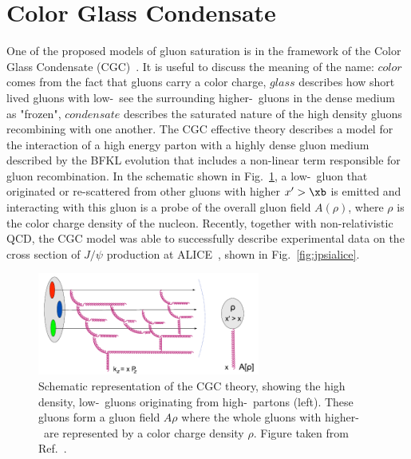 \FloatBarrier
\section{Color Glass Condensate}

One of the proposed models of gluon saturation is in the framework of the Color Glass Condensate (CGC)~\cite{Iancu:2002xk, Kharzeev:2004bw, Gelis:2012ri}. It is useful to discuss the meaning of the name: $color$ comes from the fact that gluons carry a color charge, $glass$ describes how short lived gluons with low-\xb\ see the surrounding higher-\xb\ gluons in the dense medium as "frozen", $condensate$ describes the saturated nature of the high density gluons recombining with one another. The CGC effective theory describes a model for the interaction of a high energy parton with a highly dense gluon medium described by the BFKL evolution that includes a non-linear term responsible for gluon recombination. In the schematic shown in Fig.~\ref{fig:cgcfield}, a low-\xb\ gluon that originated or re-scattered from other gluons with higher $x' > \xb$ is emitted and interacting with this gluon is a probe of the overall gluon field $A(\rho)$, where $\rho$ is the color charge density of the nucleon. Recently, together with non-relativistic QCD, the CGC model was able to successfully describe experimental data on the cross section of $J/\psi$ production at ALICE~\cite{Weber:2017kjj}, shown in Fig.~\ref{fig:jpsialice}.


\begin{figure}
	\centering
	\includegraphics[width=0.65\textwidth]{figures/cgc_field_2.pdf} 
	\caption{ Schematic representation of the CGC theory, showing the high density, low-\xb\ gluons originating from high-\xb\ partons (left). These gluons form a gluon field $A{\rho}$ where the whole gluons with higher-\xb\ are represented by a color charge density $\rho$. Figure taken from Ref.~\cite{Iancu:2012xa}. }	
	\label{fig:cgcfield}
\end{figure}


